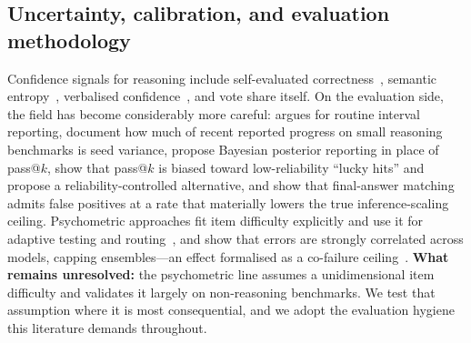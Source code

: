 \subsection{Uncertainty, calibration, and evaluation methodology}

Confidence signals for reasoning include self-evaluated
correctness~\citep{kadavath2022know}, semantic
entropy~\citep{kuhn2023semantic,farquhar2024semantic}, verbalised
confidence~\citep{lin2022teaching,tian2023just}, and vote share itself. On the
evaluation side, the field has become considerably more careful:
\citet{miller2024errorbars} argues for routine interval reporting,
\citet{hochlehnert2025sober} document how much of recent reported progress on
small reasoning benchmarks is seed variance, \citet{dontpassk2025} propose
Bayesian posterior reporting in place of pass@$k$,
\citet{coverattau2025} show that pass@$k$ is biased toward low-reliability
``lucky hits'' and propose a reliability-controlled alternative, and
\citet{falsepositives2025} show that final-answer matching admits false
positives at a rate that materially lowers the true inference-scaling ceiling.
Psychometric approaches fit item difficulty explicitly and use it for adaptive
testing and routing~\citep{atlas2025,irtnet2025,irtrouter2025,psnirt2026}, and
\citet{kim2025correlated} show that errors are strongly correlated across
models, capping ensembles---an effect formalised as a co-failure
ceiling~\citep{cofailure2026}. \textbf{What remains unresolved:} the
psychometric line assumes a unidimensional item difficulty and validates it
largely on non-reasoning benchmarks. We test that assumption where it is most
consequential, and we adopt the evaluation hygiene this literature demands
throughout.

